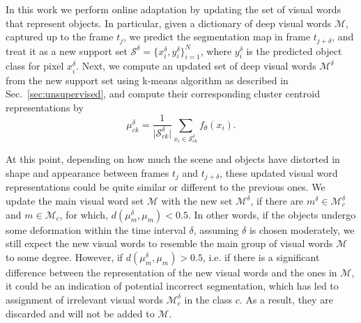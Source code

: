 \documentclass[10pt,twocolumn,letterpaper]{article}
\DeclareMathOperator*{\argmax}{arg\,max}
\begin{document}
\iffalse
Previous works have addressed the problem of online adaptation by either updating the model parameters \cite{OSVOS, onavos}, or by updating the pool of reference data points / support set \cite{Chen_2018_CVPR, Hu_2018_ECCV}. The former approach is prohibitive as it involves at least a few iterations of forward and backward pass in the network for every round of online update, which dramatically slows down the video object segmentation task. The latter, which is mostly used in Siamese-based methods \cite{Chen_2018_CVPR, Hu_2018_ECCV}, however keeps model parameters intact and updates the reference training samples whose class labels are to be transferred to the unseen examples. 
\fi

In this work we perform online adaptation by updating the set of visual words that represent objects. In particular, given a dictionary of deep visual words $\mathcal{M}$, captured up to the frame $t_j$, we predict the segmentation map in frame $t_{j+\delta}$, and treat it as a new support set $ \mathcal{S^\delta} = \{ x_i^\delta, y_i^\delta \}_{i=1}^{N}$, where $y_i^\delta$ is the predicted object class for pixel $x_i^\delta$.
Next, we compute an updated set of deep visual words $\mathcal{M^\delta}$ from the new support set using k-means algorithm as described in Sec.~\ref{sec:unsupervised}, and compute their corresponding cluster centroid representations by
\begin{equation}
\mu_{ck}^\delta = \frac{1}{\lvert \mathcal{S}_{ck}^\delta \rvert}\sum_{x_i \in \mathcal{S}_{ck}^\delta} f_\theta(x_i).
\label{online_mu}
\end{equation}

At this point, depending on how much the scene and objects have distorted in shape and appearance between frames $t_j$ and $t_{j+\delta}$, these updated visual word representations could be quite similar or different to the previous ones. We update the main visual word set $\mathcal{M}$ with the new set $\mathcal{M}^\delta$, if there are $m^\delta \in \mathcal{M}_c^\delta$ and $m \in \mathcal{M}_c$, for which, $d(\mu_{m}^\delta, \mu_m) < 0.5$. In other words, if the objects undergo some deformation within the time interval $\delta$, assuming $\delta$ is chosen moderately, we still expect the new visual words to resemble the main group of visual words $\mathcal{M}$ to some degree. However, if $d(\mu_{m}^\delta, \mu_m) > 0.5$, i.e. if there is a significant difference between the representation of the new visual words and the ones in $\mathcal{M}$, it could be an indication of potential incorrect segmentation, which has led to assignment of irrelevant visual words $\mathcal{M}_c^\delta$ in the class $c$. As a result, they are discarded and will not be added to $\mathcal{M}$.
\end{document}

